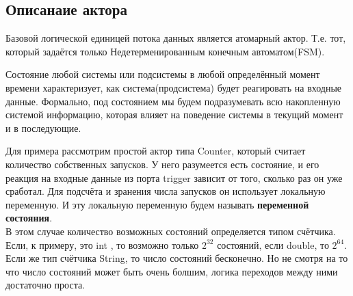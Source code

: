 \documentclass[a4paper,14pt]{article}
\begin{document}
\subsection{Описанаие актора}
Базовой логической единицей потока данных является атомарный актор. Т.е. тот, который задаётся только Недетерменированным конечным автоматом(FSM). 
 
Состояние любой системы или подсистемы в любой определённый момент времени характеризует, как система(продсистема) будет реагировать на входные данные.
Формально, под состоянием мы будем подразумевать всю накопленную системой информацию, которая влияет на поведение системы в текущий момент и в последующие.

Для примера рассмотрим простой актор типа Counter, который считает количество собственных запусков. У него разумеется есть состояние, и его реакция на входные данные из порта trigger зависит от того, сколько раз он уже сработал. Для подсчёта и зранения числа запусков он использует локальную переменную. И эту локальную переменную будем называть \textbf{переменной состояния}.
\\ 
В этом случае количество возможных состояний определяется типом счётчика. Если, к примеру, это int , то возможно только $2^{32}$ состояний, если double, то $2^{64}$. Если же тип счётчика  String, то число состояний бесконечно. Но не смотря на то что число состояний может быть очень болшим, логика переходов между ними достаточно проста. 
\end{document}
